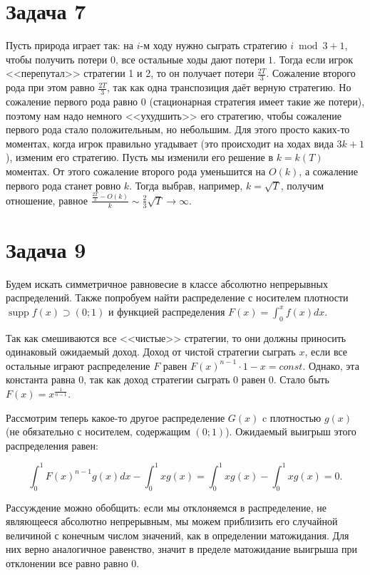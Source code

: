 \documentclass{article}
\theoremstyle{definition}
\theoremstyle{remark}
\DeclareMathOperator{\supp}{supp}
\begin{document}
\section*{Задача 7}

Пусть природа играет так: на $i$-м ходу нужно сыграть стратегию $i \bmod 3 + 1$, чтобы получить
потери $0$, все остальные ходы дают потери $1$. Тогда если игрок <<перепутал>> стратегии 1 и 2, то
он получает потери $\frac{2T}{3}$. Сожаление второго рода при этом равно $\frac{2T}{3}$, так как
одна транспозиция даёт верную стратегию. Но сожаление первого рода равно 0 (стационарная стратегия
имеет такие же потери), поэтому нам надо немного <<ухудшить>> его стратегию, чтобы сожаление
первого рода стало положительным, но небольшим. Для этого просто каких-то моментах, когда игрок
правильно угадывает (это происходит на ходах вида $3k + 1$), изменим его стратегию. Пусть мы
изменили его решение в $k = k(T)$ моментах. От этого сожаление второго рода уменьшится на $O(k)$, а
сожаление первого рода станет ровно $k$.  Тогда выбрав, например, $k = \sqrt{T}$, получим
отношение, равное $\frac{\frac{2T}{3} - O(k)}{k} \sim \frac{2}{3}\sqrt{T} \rightarrow \infty$.

\section*{Задача 9}

Будем искать симметричное равновесие в классе абсолютно непрерывных распределений. Также попробуем
найти распределение с носителем плотности $\supp f(x) \supset (0; 1)$ и функцией распределения
$F(x) = \int_0^x f(x) dx$.

Так как смешиваются все <<чистые>> стратегии, то они должны приносить одинаковый ожидаемый доход.
Доход от чистой стратегии сыграть $x$, если все остальные играют распределение $F$ равен
$F(x)^{n-1} \cdot 1 - x = const$. Однако, эта константа равна 0, так как доход стратегии сыграть 0
равен 0. Стало быть $F(x) = x^\frac{1}{n-1}$.

Рассмотрим теперь какое-то другое распределение $G(x)$ c плотностью $g(x)$ (не обязательно с
носителем, содержащим $(0;1)$). Ожидаемый выигрыш этого распределения равен:

$$ \int_0^1 F(x)^{n-1} g(x) dx - \int_0^1 x g(x) = \int_0^1 xg(x) - \int_0^1 x g(x) = 0. $$

Рассуждение можно обобщить: если мы отклоняемся в распределение, не являющееся абсолютно
непрерывным, мы можем приблизить его случайной величиной с конечным числом значений, как в
определении матожидания. Для них верно аналогичное равенство, значит в пределе матожидание выигрыша
при отклонении все равно равно 0.
\end{document}
